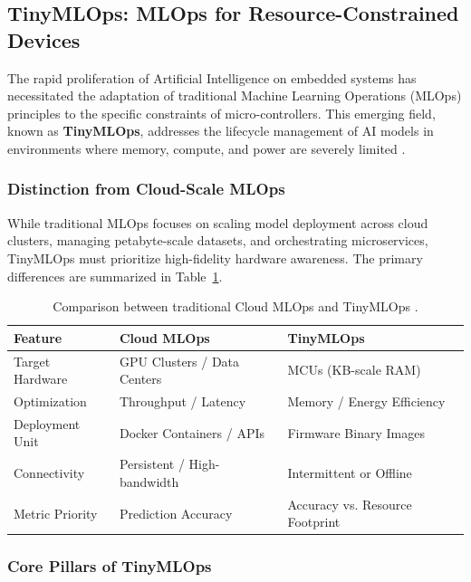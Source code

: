 \subsection{TinyMLOps: MLOps for Resource-Constrained Devices}

The rapid proliferation of Artificial Intelligence on embedded systems has necessitated the adaptation of traditional Machine Learning Operations (MLOps) principles to the specific constraints of micro-controllers. This emerging field, known as \textbf{TinyMLOps}, addresses the lifecycle management of AI models in environments where memory, compute, and power are severely limited \cite{warden2019tinyml}.

\subsubsection{Distinction from Cloud-Scale MLOps}

While traditional MLOps focuses on scaling model deployment across cloud clusters, managing petabyte-scale datasets, and orchestrating microservices, TinyMLOps must prioritize high-fidelity hardware awareness. The primary differences are summarized in Table~\ref{tab:mlops_vs_tinymlops}.

\begin{table}[h]
    \centering
    \caption{Comparison between traditional Cloud MLOps and TinyMLOps \cite{mlops_productivity_2024}.}
    \label{tab:mlops_vs_tinymlops}
    \begin{tabular}{|l|l|l|}
        \hline
        \textbf{Feature} & \textbf{Cloud MLOps}        & \textbf{TinyMLOps}              \\
        \hline
        Target Hardware  & GPU Clusters / Data Centers & MCUs (KB-scale RAM)             \\
        Optimization     & Throughput / Latency        & Memory / Energy Efficiency      \\
        Deployment Unit  & Docker Containers / APIs    & Firmware Binary Images          \\
        Connectivity     & Persistent / High-bandwidth & Intermittent or Offline         \\
        Metric Priority  & Prediction Accuracy         & Accuracy vs. Resource Footprint \\
        \hline
    \end{tabular}
\end{table}

\subsubsection{Core Pillars of TinyMLOps}

